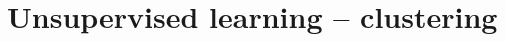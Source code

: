 \section{Unsupervised learning – clustering} \label{Unsupervised learning – clustering}
\hrulefill  %

